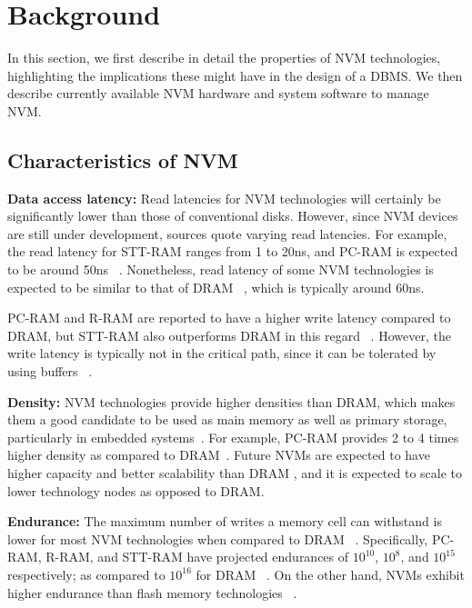 \section{Background}
\label{sec:background}
\noindent In this section, we first describe in detail the properties of NVM technologies, highlighting the implications these might have in the design of a DBMS. We then describe currently available NVM hardware and  system software to manage NVM.


\subsection{Characteristics of NVM}
\noindent \textbf{Data access latency:} Read latencies for NVM technologies will certainly be significantly lower than those of conventional disks. However, since NVM devices are still under development, sources quote varying read latencies. For example, the read latency for STT-RAM ranges from 1 to 20ns, and PC-RAM is expected to be around 50ns ~\cite{arulraj2015let,wang2013low,perez2010non}. Nonetheless, read latency of some NVM technologies is expected to be similar to that of DRAM ~\cite{mittal2016survey,arulraj2015let,wang2013low,chang2012limits,arulraj2016write,oukid2014sofort,chatzistergiou2015rewind}, which is typically around 60ns.

PC-RAM and R-RAM are reported to have a higher write latency compared to DRAM, but STT-RAM also outperforms DRAM in this regard ~\cite{arulraj2015let,wang2013low}. However, the write latency is typically not in the critical path, since it can be tolerated by using buffers ~\cite{qureshi2009scalable}.

\noindent\textbf{Density:} NVM technologies provide higher densities than DRAM, which makes them a good candidate to be used as main memory as well as primary storage, particularly in embedded systems~\cite{huang2012register}. For example, PC-RAM provides 2 to 4 times higher density as compared to DRAM~\cite{qureshi2009scalable}. Future NVMs are expected to have higher capacity and better scalability than DRAM \cite{oukid2015instant,chakrabarti2014atlas,zhang2015study,viglas2014write}
, and it is expected to scale to lower technology nodes as opposed to DRAM.

\noindent\textbf{Endurance:} The maximum number of writes a memory cell can withstand is lower for most NVM 
technologies when compared to DRAM ~\cite{qureshi2009scalable,zhou2009durable}. Specifically, PC-RAM, R-RAM, 
and STT-RAM have projected endurances of $10^{10}$, $10^{8}$, and $10^{15}$ respectively;  as compared to 
$10^{16}$ for DRAM ~\cite{arulraj2015let}. On the other hand, NVMs exhibit higher endurance than flash 
memory technologies ~\cite{wang2013low}.

